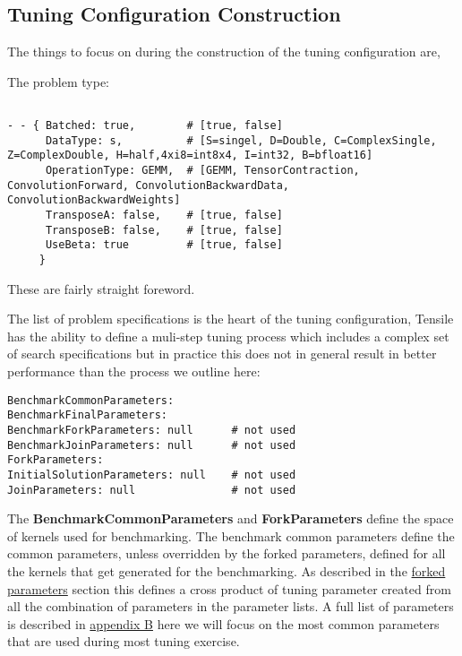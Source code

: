 \documentclass[]{article}
\begin{document}
\subsection{Tuning Configuration Construction}

The things to focus on during the construction of the tuning configuration are,

The problem type:
\begin{verbatim}

- - { Batched: true,        # [true, false]
      DataType: s,          # [S=singel, D=Double, C=ComplexSingle, Z=ComplexDouble, H=half,4xi8=int8x4, I=int32, B=bfloat16]
      OperationType: GEMM,  # [GEMM, TensorContraction, ConvolutionForward, ConvolutionBackwardData, ConvolutionBackwardWeights]
      TransposeA: false,    # [true, false]
      TransposeB: false,    # [true, false]
      UseBeta: true         # [true, false]
     }         

\end{verbatim}

These are fairly straight foreword. 

The list of problem specifications is the heart of the tuning configuration, Tensile has the ability to define a muli-step tuning process which includes a complex set of search specifications but in practice this does not in general result in better performance than the process we outline here:
\begin{verbatim}
BenchmarkCommonParameters:
BenchmarkFinalParameters: 
BenchmarkForkParameters: null      # not used
BenchmarkJoinParameters: null      # not used
ForkParameters:
InitialSolutionParameters: null    # not used
JoinParameters: null               # not used
\end{verbatim}

The  {\color{ForestGreen} \bf BenchmarkCommonParameters} and  {\color{ForestGreen} \bf ForkParameters} define the space of kernels used for benchmarking. The benchmark common parameters define the common parameters, unless overridden by the forked parameters, defined for all the kernels that get generated for the benchmarking. As described in the \hyperref[sec:forkParams]{forked parameters} section this defines a cross product of tuning parameter created from all the combination of parameters in the parameter lists. A full list of parameters is described in \hyperref[sec:appendixB]{appendix B} here we will focus on the most common parameters that are used during most tuning exercise. 
\end{document}
